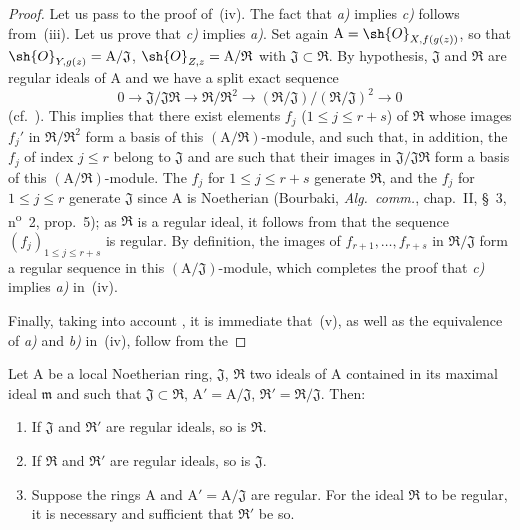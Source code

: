 \begin{proof}
Let us pass to the proof of~(iv).
The fact that \emph{a)} implies \emph{c)} follows from~(iii).
Let us prove that \emph{c)} implies \emph{a)}.
Set again $\mathrm{A}=\sh{O}_{X,f(g(z))}$, so that $\sh{O}_{Y,g(z)}=\mathrm{A}/\mathfrak{J}$,
$\sh{O}_{Z,z}=\mathrm{A}/\mathfrak{R}$ with $\mathfrak{J}\subset\mathfrak{R}$.
By hypothesis, $\mathfrak{J}$ and $\mathfrak{R}$ are regular ideals of $\mathrm{A}$ and we have a split exact sequence
\[
  0\to\mathfrak{J}/\mathfrak{J}\mathfrak{R}\to\mathfrak{R}/\mathfrak{R}^2\to(\mathfrak{R}/\mathfrak{J})/(\mathfrak{R}/\mathfrak{J})^2\to 0
\]
(cf.\ ).
This implies that there exist elements $f_j$ ($1\leq j\leq r+s$) of $\mathfrak{R}$ whose images $f_j'$ in $\mathfrak{R}/\mathfrak{R}^2$ form a basis of this $(\mathrm{A}/\mathfrak{R})$-module, and such that, in addition, the $f_j$ of index $j\leq r$ belong to $\mathfrak{J}$ and are such that their images in $\mathfrak{J}/\mathfrak{J}\mathfrak{R}$ form a basis of this $(\mathrm{A}/\mathfrak{R})$-module.
The $f_j$ for $1\leq j\leq r+s$ generate $\mathfrak{R}$, and the $f_j$ for $1\leq j\leq r$ generate $\mathfrak{J}$ since $\mathrm{A}$ is Noetherian (Bourbaki, \emph{Alg.\ comm.}, chap.~II, \S~3, n\textsuperscript{o}~2, prop.~5); as $\mathfrak{R}$ is a regular ideal, it follows from  that the sequence $(f_j)_{1\leq j\leq r+s}$ is regular.
By definition, the images of $f_{r+1},\ldots,f_{r+s}$ in $\mathfrak{R}/\mathfrak{J}$ form a regular sequence in this $(\mathrm{A}/\mathfrak{J})$-module, which completes the proof that \emph{c)} implies \emph{a)} in~(iv).

Finally, taking into account , it is immediate that~(v), as well as the equivalence of \emph{a)} and \emph{b)} in~(iv), follow from the
\end{proof}

\begin{corollary}[19.1.6]
\label{IV.19.1.6}
Let $\mathrm{A}$ be a local Noetherian ring, $\mathfrak{J}$, $\mathfrak{R}$ two ideals of $\mathrm{A}$ contained in its maximal ideal $\mathfrak{m}$ and such that $\mathfrak{J}\subset\mathfrak{R}$, $\mathrm{A}'=\mathrm{A}/\mathfrak{J}$, $\mathfrak{R}'=\mathfrak{R}/\mathfrak{J}$.
Then:
\begin{enumerate}[label=(\roman*)]
  \item If $\mathfrak{J}$ and $\mathfrak{R}'$ are regular ideals, so is $\mathfrak{R}$.
  \item If $\mathfrak{R}$ and $\mathfrak{R}'$ are regular ideals, so is $\mathfrak{J}$.
  \item Suppose the rings $\mathrm{A}$ and $\mathrm{A}'=\mathrm{A}/\mathfrak{J}$ are regular.
For the ideal $\mathfrak{R}$ to be regular, it is necessary and sufficient that $\mathfrak{R}'$ be so.
\end{enumerate}
\end{corollary}

